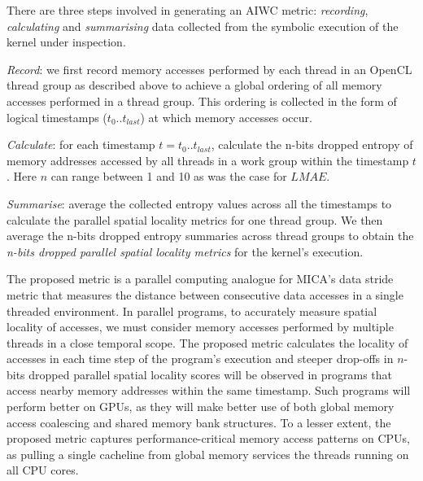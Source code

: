 \documentclass[review=false, sigchi]{acmart}
\begin{document}
	There are three steps involved in generating an AIWC metric: \textit{recording}, \textit{calculating} and \textit{summarising} data collected from the symbolic execution of the kernel under inspection.
	
	\textit{Record}: we first record memory accesses performed by each thread in an OpenCL thread group as described above to achieve a global ordering of all memory accesses performed in a thread group. This ordering is collected in the form of logical timestamps ($t_0 .. t_{last}$) at which memory accesses occur.
	
	\textit{Calculate}: for each timestamp $t = t_0 .. t_{last}$, calculate the n-bits dropped entropy of memory addresses accessed by all threads in a work group within the timestamp $t$. Here $n$ can range between 1 and 10 as was the case for $LMAE$.
	
	\textit{Summarise}: average the collected entropy values across all the timestamps to calculate the parallel spatial locality metrics for one thread group. We then average the n-bits dropped entropy summaries across thread groups to obtain the \textit{n-bits dropped parallel spatial locality metrics} for the kernel's execution.
	
	

	The proposed metric is a parallel computing analogue for MICA's data stride metric that measures the distance between consecutive data accesses in a single threaded environment. 
	In parallel programs, to accurately measure spatial locality of accesses, we must consider memory accesses performed by multiple threads in a close temporal scope. 
	The proposed metric calculates the locality of accesses in each time step of the program's execution and steeper drop-offs in $n$-bits dropped parallel spatial locality scores will be observed in programs that access nearby memory addresses within the same timestamp.
	Such programs will perform better on GPUs, as they will make better use of both global memory access coalescing and shared memory bank structures.
	To a lesser extent, the proposed metric captures performance-critical memory access patterns on CPUs, as pulling a single cacheline from global memory services the threads running on all CPU cores. %
	
\end{document}

